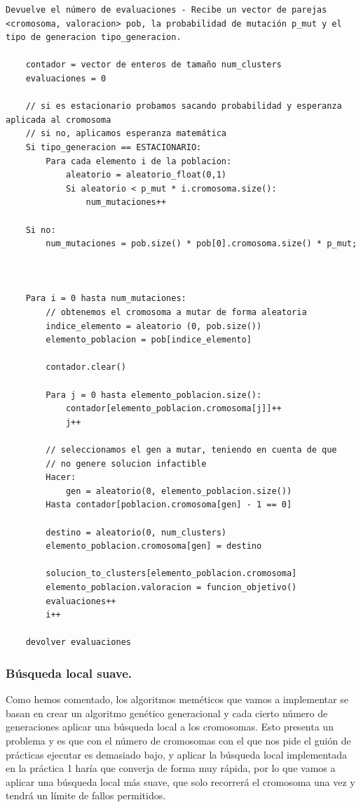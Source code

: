 \documentclass[12pt, spanish]{article}
\begin{document}
\begin{lstlisting}
Devuelve el número de evaluaciones - Recibe un vector de parejas <cromosoma, valoracion> pob, la probabilidad de mutación p_mut y el tipo de generacion tipo_generacion.

	contador = vector de enteros de tamaño num_clusters
	evaluaciones = 0
	
	// si es estacionario probamos sacando probabilidad y esperanza aplicada al cromosoma
	// si no, aplicamos esperanza matemática
	Si tipo_generacion == ESTACIONARIO:
		Para cada elemento i de la poblacion:
			aleatorio = aleatorio_float(0,1)
			Si aleatorio < p_mut * i.cromosoma.size():
				num_mutaciones++

	Si no:
		num_mutaciones = pob.size() * pob[0].cromosoma.size() * p_mut;
		
		
		
	Para i = 0 hasta num_mutaciones:
		// obtenemos el cromosoma a mutar de forma aleatoria
		indice_elemento = aleatorio (0, pob.size())
		elemento_poblacion = pob[indice_elemento]
		
		contador.clear()
		
		Para j = 0 hasta elemento_poblacion.size():
			contador[elemento_poblacion.cromosoma[j]]++
			j++
			
		// seleccionamos el gen a mutar, teniendo en cuenta de que
		// no genere solucion infactible
		Hacer:
			gen = aleatorio(0, elemento_poblacion.size())
		Hasta contador[poblacion.cromosoma[gen] - 1 == 0]
		
		destino = aleatorio(0, num_clusters)
		elemento_poblacion.cromosoma[gen] = destino
		
		solucion_to_clusters[elemento_poblacion.cromosoma]
		elemento_poblacion.valoracion = funcion_objetivo()
		evaluaciones++
		i++
	
	devolver evaluaciones
\end{lstlisting}

\subsubsection{Búsqueda local suave.}

Como hemos comentado, los algoritmos meméticos que vamos a implementar se basan en crear un algoritmo genético generacional y cada cierto número de generaciones aplicar una búsqueda local a los cromosomas. Esto presenta un problema y es que con el número de cromosomas con el que nos pide el guión de prácticas ejecutar es demasiado bajo, y aplicar la búsqueda local implementada en la práctica 1 haría que converja de forma muy rápida, por lo que vamos a aplicar una búsqueda local más suave, que solo recorrerá el cromosoma una vez y tendrá un límite de fallos permitidos.
\end{document}
